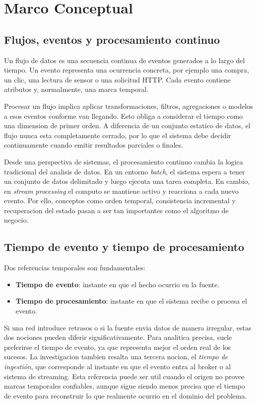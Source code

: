 \documentclass[12pt,a4paper]{article}
\begin{document}
\section{Marco Conceptual}

\subsection{Flujos, eventos y procesamiento continuo}

Un flujo de datos es una secuencia continua de eventos generados a lo largo del tiempo. Un evento representa una ocurrencia concreta, por ejemplo una compra, un clic, una lectura de sensor o una solicitud HTTP. Cada evento contiene atributos y, normalmente, una marca temporal.

Procesar un flujo implica aplicar transformaciones, filtros, agregaciones o modelos a esos eventos conforme van llegando. Esto obliga a considerar el tiempo como una dimension de primer orden. A diferencia de un conjunto estatico de datos, el flujo nunca esta completamente cerrado, por lo que el sistema debe decidir continuamente cuando emitir resultados parciales o finales.

Desde una perspectiva de sistemas, el procesamiento continuo cambia la logica tradicional del analisis de datos. En un entorno \textit{batch}, el sistema espera a tener un conjunto de datos delimitado y luego ejecuta una tarea completa. En cambio, en \textit{stream processing} el computo se mantiene activo y reacciona a cada nuevo evento. Por ello, conceptos como orden temporal, consistencia incremental y recuperacion del estado pasan a ser tan importantes como el algoritmo de negocio.

\subsection{Tiempo de evento y tiempo de procesamiento}

Dos referencias temporales son fundamentales:

\begin{itemize}
  \item \textbf{Tiempo de evento}: instante en que el hecho ocurrio en la fuente.
  \item \textbf{Tiempo de procesamiento}: instante en que el sistema recibe o procesa el evento.
\end{itemize}

Si una red introduce retrasos o si la fuente envia datos de manera irregular, estas dos nociones pueden diferir significativamente. Para analitica precisa, suele preferirse el tiempo de evento, ya que representa mejor el orden real de los sucesos. La investigacion tambien resalta una tercera nocion, el \textit{tiempo de ingestión}, que corresponde al instante en que el evento entra al broker o al sistema de streaming. Esta referencia puede ser util cuando el origen no provee marcas temporales confiables, aunque sigue siendo menos precisa que el tiempo de evento para reconstruir lo que realmente ocurrio en el dominio del problema.
\end{document}
